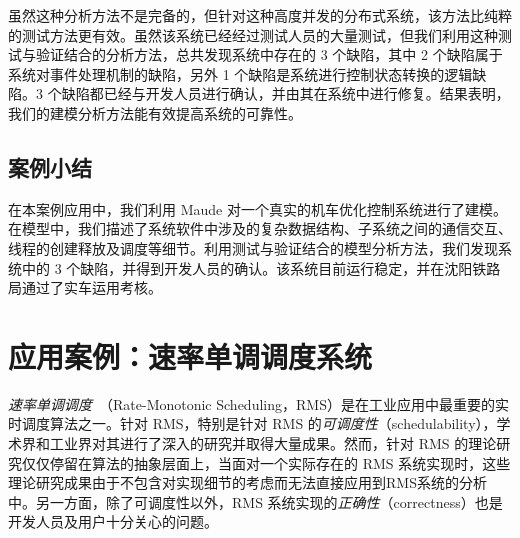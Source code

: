 虽然这种分析方法不是完备的，但针对这种高度并发的分布式系统，该方法比纯粹的测试方法更有效。虽然该系统已经经过测试人员的大量测试，但我们利用这种测试与验证结合的分析方法，总共发现系统中存在的 3 个缺陷，其中 2 个缺陷属于系统对事件处理机制的缺陷，另外 1 个缺陷是系统进行控制状态转换的逻辑缺陷。3 个缺陷都已经与开发人员进行确认，并由其在系统中进行修复。结果表明，我们的建模分析方法能有效提高系统的可靠性。


\subsection{案例小结}

在本案例应用中，我们利用 Maude 对一个真实的机车优化控制系统进行了建模。在模型中，我们描述了系统软件中涉及的复杂数据结构、子系统之间的通信交互、线程的创建释放及调度等细节。利用测试与验证结合的模型分析方法，我们发现系统中的 3 个缺陷，并得到开发人员的确认。该系统目前运行稳定，并在沈阳铁路局通过了实车运用考核。

 
\section{应用案例：速率单调调度系统}
\label{s:RMS}

\hide{
\usepackage{graphicx}
\usepackage[noadjust]{cite}
\usepackage{picinpar}
\usepackage{amsmath}
\usepackage{stfloats}
\usepackage{url}
\usepackage{flushend}
\usepackage[latin1]{inputenc}
\usepackage{colortbl}
\usepackage{soul}
\usepackage{multirow}
\usepackage{pifont}
\usepackage{color}
\usepackage[hidelinks,bookmarks=false]{hyperref}
\usepackage{enumerate}
\usepackage{siunitx}
\usepackage{breakurl}
\usepackage{epstopdf}
\usepackage{pbox}
}


\hide{
\makeatletter
\def\verbatim{\small\@verbatim \frenchspacing\@vobeyspaces \@xverbatim}
\makeatother
}


\emph{速率单调调度}~\cite{DBLP:journals/jacm/LiuL73}（Rate-Monotonic Scheduling，RMS）是在工业应用中最重要的实时调度算法之一。针对 RMS，特别是针对 RMS 的\emph{可调度性}（schedulability），学术界和工业界对其进行了深入的研究并取得大量成果。然而，针对 RMS 的理论研究仅仅停留在算法的抽象层面上，当面对一个实际存在的 RMS 系统实现时，这些理论研究成果由于不包含对实现细节的考虑而无法直接应用到RMS系统的分析中。另一方面，除了可调度性以外，RMS 系统实现的\emph{正确性}（correctness）也是开发人员及用户十分关心的问题。

